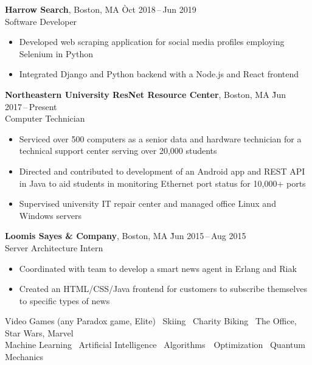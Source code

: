 \documentclass[11pt]{article}
\newcommand{\ressection}[1]{%
  \vspace{12pt}{\Large{\textsc{#1}}} \titlerule[0.5pt] \par
}
\begin{document}
\begin{tabbing}
  \textbf{Harrow Search}, Boston, MA \` Oct 2018\,--\,Jun 2019 \\
  Software Developer
\end{tabbing}
\begin{itemize}
  \item Developed web scraping application for social media profiles employing Selenium in Python
  \item Integrated Django and Python backend with a Node.js and React frontend
\end{itemize}

\begin{tabbing}
  \textbf{Northeastern University ResNet Resource Center}, Boston, MA \` Jun 2017\,--\,Present \\
  Computer Technician
\end{tabbing}
\begin{itemize}
  \item Serviced over 500 computers as a senior data and hardware technician for a technical support center serving over 20,000 students
  \item Directed and contributed to development of an Android app and REST API in Java to aid students in monitoring Ethernet port status for 10,000+ ports
  \item Supervised university IT repair center and managed office Linux and Windows servers
\end{itemize}

\begin{tabbing}
  \textbf{Loomis Sayes \& Company}, Boston, MA \` Jun 2015\,--\,Aug 2015 \\
  Server Architecture Intern
\end{tabbing}
\begin{itemize}
  \item Coordinated with team to develop a smart news agent in Erlang and Riak
  \item Created an HTML/CSS/Java frontend for customers to subscribe themselves to specific types of news
\end{itemize}

\ressection{Interests}
\begin{center}
Video Games (any Paradox game, Elite) \textbullet\ Skiing \textbullet\ Charity Biking \textbullet\ The Office, Star Wars, Marvel \\
Machine Learning \textbullet\ Artificial Intelligence \textbullet\ Algorithms\ \textbullet\ Optimization \textbullet\ Quantum Mechanics
\end{center}
\end{document}
